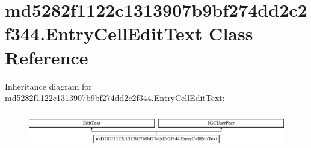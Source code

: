 \hypertarget{classmd5282f1122c1313907b9bf274dd2c2f344_1_1EntryCellEditText}{}\section{md5282f1122c1313907b9bf274dd2c2f344.\+Entry\+Cell\+Edit\+Text Class Reference}
\label{classmd5282f1122c1313907b9bf274dd2c2f344_1_1EntryCellEditText}
Inheritance diagram for md5282f1122c1313907b9bf274dd2c2f344.\+Entry\+Cell\+Edit\+Text\+:\begin{figure}[H]
\begin{center}
\leavevmode
\includegraphics[height=1.564246cm]{classmd5282f1122c1313907b9bf274dd2c2f344_1_1EntryCellEditText}
\end{center}
\end{figure}
